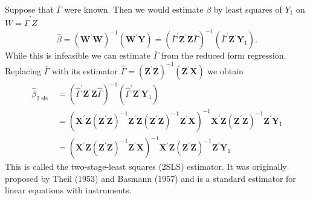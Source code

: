\documentclass[10pt]{article}
\begin{document}
Suppose that $\bar{\Gamma}$ were known. Then we would estimate $\beta$ by least squares of $Y_{1}$ on $W=\bar{\Gamma}^{\prime} Z$
$$
\widehat{\beta}=\left(\boldsymbol{W}^{\prime} \boldsymbol{W}\right)^{-1}\left(\boldsymbol{W}^{\prime} \boldsymbol{Y}\right)=\left(\bar{\Gamma}^{\prime} \boldsymbol{Z}^{\prime} \boldsymbol{Z} \bar{\Gamma}\right)^{-1}\left(\bar{\Gamma}^{\prime} \boldsymbol{Z}^{\prime} \boldsymbol{Y}_{1}\right) .
$$
While this is infeasible we can estimate $\bar{\Gamma}$ from the reduced form regression. Replacing $\bar{\Gamma}$ with its estimator $\widehat{\Gamma}=\left(\boldsymbol{Z}^{\prime} \boldsymbol{Z}\right)^{-1}\left(\boldsymbol{Z}^{\prime} \boldsymbol{X}\right)$ we obtain
$$
\begin{aligned}
\widehat{\beta}_{2 \text { sls }} &=\left(\widehat{\Gamma}^{\prime} \boldsymbol{Z}^{\prime} \boldsymbol{Z} \widehat{\Gamma}\right)^{-1}\left(\widehat{\Gamma}^{\prime} \boldsymbol{Z}^{\prime} \boldsymbol{Y}_{1}\right) \\
&=\left(\boldsymbol{X}^{\prime} \boldsymbol{Z}\left(\boldsymbol{Z}^{\prime} \boldsymbol{Z}\right)^{-1} \boldsymbol{Z}^{\prime} \boldsymbol{Z}\left(\boldsymbol{Z}^{\prime} \boldsymbol{Z}\right)^{-\mathbf{1}} \boldsymbol{Z}^{\prime} \boldsymbol{X}\right)^{-1} \boldsymbol{X}^{\prime} \boldsymbol{Z}\left(\boldsymbol{Z}^{\prime} \boldsymbol{Z}\right)^{-1} \boldsymbol{Z}^{\prime} \boldsymbol{Y}_{1} \\
&=\left(\boldsymbol{X}^{\prime} \boldsymbol{Z}\left(\boldsymbol{Z}^{\prime} \boldsymbol{Z}\right)^{-1} \boldsymbol{Z}^{\prime} \boldsymbol{X}\right)^{-1} \boldsymbol{X}^{\prime} \boldsymbol{Z}\left(\boldsymbol{Z}^{\prime} \boldsymbol{Z}\right)^{-1} \boldsymbol{Z}^{\prime} \boldsymbol{Y}_{1}
\end{aligned}
$$
This is called the two-stage-least squares (2SLS) estimator. It was originally proposed by Theil (1953) and Basmann (1957) and is a standard estimator for linear equations with instruments.
\end{document}
